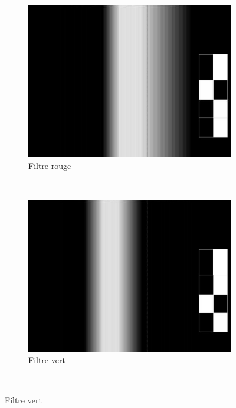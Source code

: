 \begin{itemize}
\begin{figure}
					    \begin{subfigure}[b]{0.3\textwidth}
					        \includegraphics[width=\textwidth]{Graphics/opencvR.jpg}
					        \caption{Filtre rouge}
					    \end{subfigure}
					    ~ %
					    \begin{subfigure}[b]{0.3\textwidth}
					        \includegraphics[width=\textwidth]{Graphics/opencvG.jpg}
					        \caption{Filtre vert}
					    \end{subfigure}
					    ~ %

\end{figure}
\end{itemize}
